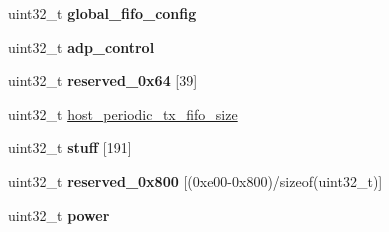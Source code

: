 \begin{DoxyCompactItemize}
\item 
\hypertarget{structdwc__regs_a319b9c809711c39b096b818700538e82}{uint32\-\_\-t {\bfseries global\-\_\-fifo\-\_\-config}}\label{structdwc__regs_a319b9c809711c39b096b818700538e82}

\item 
\hypertarget{structdwc__regs_a2e377f18d8ae67bfd710b81cdc8c916a}{uint32\-\_\-t {\bfseries adp\-\_\-control}}\label{structdwc__regs_a2e377f18d8ae67bfd710b81cdc8c916a}

\item 
\hypertarget{structdwc__regs_a72b0722d638c8fe9e1f1f26143ad5b59}{uint32\-\_\-t {\bfseries reserved\-\_\-0x64} \mbox{[}39\mbox{]}}\label{structdwc__regs_a72b0722d638c8fe9e1f1f26143ad5b59}

\item 
uint32\-\_\-t \hyperlink{structdwc__regs_a481970c75328e0debfd7e8285b42b1af}{host\-\_\-periodic\-\_\-tx\-\_\-fifo\-\_\-size}
\item 
\hypertarget{structdwc__regs_aa644fa93e19b7df2cc372fff393036f1}{uint32\-\_\-t {\bfseries stuff} \mbox{[}191\mbox{]}}\label{structdwc__regs_aa644fa93e19b7df2cc372fff393036f1}

\item 
\hypertarget{structdwc__regs_a2f17ef7ffaf9168a455d57915869a575}{uint32\-\_\-t {\bfseries reserved\-\_\-0x800} \mbox{[}(0xe00-\/0x800)/sizeof(uint32\-\_\-t)\mbox{]}}\label{structdwc__regs_a2f17ef7ffaf9168a455d57915869a575}

\item 
\hypertarget{structdwc__regs_a2a422cd4a4cd63c652e3a7a3e2b6eb80}{uint32\-\_\-t {\bfseries power}}\label{structdwc__regs_a2a422cd4a4cd63c652e3a7a3e2b6eb80}

\end{DoxyCompactItemize}

